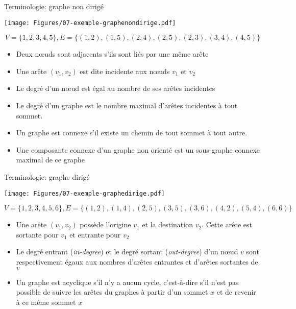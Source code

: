 \begin{frame}{Terminologie: graphe non dirigé}

\centerline{\texttt{[image: Figures/07-exemple-graphenondirige.pdf]}}
{\small $$V=\{1,2,3,4,5\}, E=\{(1,2),(1,5),(2,4),(2,5),(2,3),(3,4),(4,5)\}$$}
\begin{itemize}
\item Deux n\oe uds sont \alert{adjacents} s'ils sont liés par une même arête
\item Une arête $(v_1,v_2)$ est dite \alert{incidente} aux n\oe uds $v_1$ et $v_2$
\item Le \alert{degré} d'un n\oe ud est égal au nombre de ses arêtes incidentes
\item Le \alert{degré d'un graphe} est le nombre maximal d'arêtes incidentes à tout sommet.
\item Un graphe est \alert{connexe} s'il existe un chemin de tout sommet à tout autre.
\item Une \alert{composante connexe} d'un graphe non orienté est un sous-graphe connexe
  maximal de ce graphe
\end{itemize}

\end{frame}

\begin{frame}{Terminologie: graphe dirigé}

\centerline{\texttt{[image: Figures/07-exemple-graphedirige.pdf]}}
{\small $$V=\{1,2,3,4,5,6\}, E=\{(1,2),(1,4),(2,5),(3,5),(3,6),(4,2),(5,4),(6,6)\}$$}
\begin{itemize}
\item Une arête $(v_1,v_2)$ possède l'\alert{origine} $v_1$ et la \alert{destination}
  $v_2$. Cette arête est \alert{sortante} pour $v_1$ et \alert{entrante} pour $v_2$
\item Le degré \alert{entrant} ({\it in-degree}) et le degré \alert{sortant}
  ({\it out-degree}) d'un n\oe ud $v$ sont respectivement égaux aux nombres d'arêtes entrantes et d'arêtes sortantes de $v$
\item Un graphe est \alert{acyclique} s'il n'y a aucun cycle, c'est-à-dire
  s'il n'est pas possible de suivre les arêtes du graphes à partir
  d'un sommet $x$ et de revenir à ce même sommet $x$
\end{itemize}

\end{frame}

